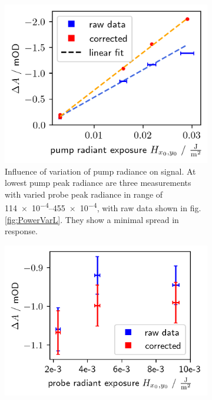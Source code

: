 \documentclass[twoside,openright]{scrreprt}
\begin{document}
\begin{figure}[hbtp]
\begin{subfigure}[t]{0.5\linewidth}
\centering
\includegraphics[width=\linewidth]{images/PowerVariationCorrectedPump.png}
\caption{Influence of variation of pump radiance on signal. At lowest pump peak radiance are three measurements with varied probe peak radiance in range of \SIrange{114e-4}{455e-4}{\radExp}, with raw data shown in fig. \ref{fig:PowerVarL}. They show a minimal spread in response.}
\end{subfigure}\hfill
\begin{subfigure}[t]{0.5\linewidth}
\centering
\includegraphics[width=\linewidth]{images/PowerVariationCorrectedProbe.png}

\end{subfigure}
\end{figure}
\end{document}
